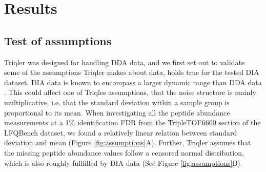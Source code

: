 \documentclass[10pt,letterpaper]{article}
\begin{document}


\section*{Results}



\subsection*{Test of assumptions}

Triqler was designed for handling DDA data, and we first set out to validate some of the assumptions Triqler makes about data, holds true for the tested DIA dataset.
DIA data is known to encompass a larger dynamic range than DDA data . This could affect one of Triqles assumptions, that the noise structure is mainly multiplicative, i.e. that the standard deviation within a sample group is proportional to its mean. When investigating all the peptide abundance measurements at a 1\% identification FDR from the TripleTOF6600 section of the LFQBench dataset, we found a relatively linear relation between standard deviation and mean (Figure \ref{fig:assumptions}A). Further, Triqler assumes that the missing peptide abundance values follow a censored normal distribution, which is also roughly fullfilled by DIA data (See Figure \ref{fig:assumptions}B).
\end{document}
